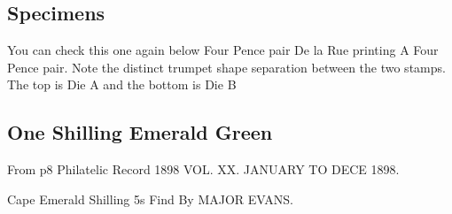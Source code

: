 

\subsection{Specimens
} 






You can check this one again below
Four Pence pair De la Rue printing
A Four Pence pair. Note the distinct trumpet shape separation between the two stamps. The top is Die A and the bottom is Die B



\subsection{One Shilling Emerald Green}

From p8 Philatelic Record 1898 VOL. XX. JANUARY TO DECE
1898.

Cape  Emerald Shilling 5s Find
By MAJOR EVANS.

